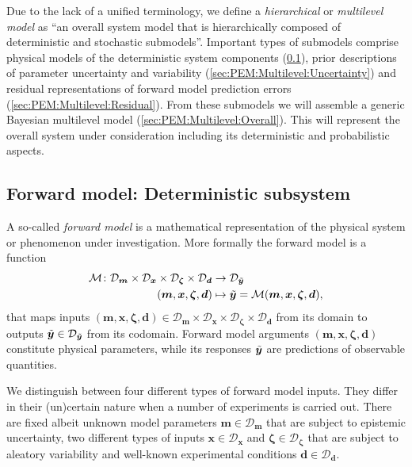 Due to the lack of a unified terminology, we define a \textit{hierarchical} or \textit{multilevel model} as
``an overall system model that is hierarchically composed of deterministic and stochastic submodels''.
Important types of submodels comprise physical models of the deterministic system components (\cref{sec:PEM:Multilevel:ForwardModel}),
prior descriptions of parameter uncertainty and variability (\cref{sec:PEM:Multilevel:Uncertainty})
and residual representations of forward model prediction errors (\cref{sec:PEM:Multilevel:Residual}).
From these submodels we will assemble a generic Bayesian multilevel model (\cref{sec:PEM:Multilevel:Overall}).
This will represent the overall system under consideration including its deterministic and probabilistic aspects.

\subsection{Forward model: Deterministic subsystem} \label{sec:PEM:Multilevel:ForwardModel}
A so-called \textit{forward model} is a mathematical representation of the physical system or phenomenon under investigation.
More formally the forward model is a function
\begin{equation} \label{eq:PEM:Multilevel:ForwardModel}
  \begin{aligned}
    \mathcal{M} \colon \mathcal{D}_{\bm{m}} \times \mathcal{D}_{\bm{x}} \times \mathcal{D}_{\bm{\zeta}} \times \mathcal{D}_{\bm{d}} &\rightarrow \mathcal{D}_{\tilde{\bm{y}}}\\
    (\bm{m},\bm{x},\bm{\zeta},\bm{d}) &\mapsto \tilde{\bm{y}} = \mathcal{M}(\bm{m},\bm{x},\bm{\zeta},\bm{d}),
  \end{aligned}
\end{equation}
that maps inputs \((\bm{m},\bm{x},\bm{\zeta},\bm{d}) \in \mathcal{D}_{\bm{m}} \times \mathcal{D}_{\bm{x}} \times \mathcal{D}_{\bm{\zeta}} \times \mathcal{D}_{\bm{d}}\)
from its domain to outputs \(\tilde{\bm{y}} \in \mathcal{D}_{\tilde{\bm{y}}}\) from its codomain.
Forward model arguments \((\bm{m},\bm{x},\bm{\zeta},\bm{d})\) constitute physical parameters, while its responses \(\tilde{\bm{y}}\) are predictions of observable quantities.
\par %
We distinguish between four different types of forward model inputs.
They differ in their (un)certain nature when a number of experiments is carried out.
There are fixed albeit unknown model parameters \(\bm{m} \in \mathcal{D}_{\bm{m}}\) that are subject to epistemic uncertainty,
two different types of inputs \(\bm{x} \in \mathcal{D}_{\bm{x}}\) and \(\bm{\zeta} \in \mathcal{D}_{\bm{\zeta}}\) that are subject to aleatory variability
and well-known experimental conditions \(\bm{d} \in \mathcal{D}_{\bm{d}}\).


